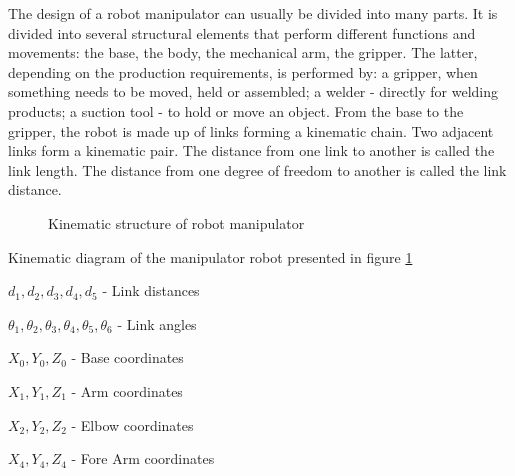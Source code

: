 The design of a robot manipulator can usually be divided into many parts.
It is divided into several structural elements that perform different functions and movements: the base, the body, the mechanical arm, the gripper. The latter, depending on the production requirements, is performed by: a gripper, when something needs to be moved, held or assembled; a welder - directly for welding products; a suction tool - to hold or move an object. From the base to the gripper, the robot is made up of links forming a kinematic chain. Two adjacent links form a kinematic pair. The distance from one link to another is called the link length. The distance from one degree of freedom to another is called the link distance. 



\begin{figure}[H]
	\centering


\caption{Kinematic structure of robot manipulator} \label{fig:kinematic1}
\end{figure}

Kinematic diagram of the manipulator robot presented in figure \ref{fig:kinematic1} 


\begin{math}d_1 , d_2, d_3,d_4,d_5 \end{math} - Link distances

\begin{math}\theta_1 , \theta_2, \theta_3,\theta_4,\theta_5,\theta_6\end{math} - Link angles

\begin{math} X_0, Y_0, Z_0 \end{math} - Base coordinates

\begin{math} X_1, Y_1, Z_1 \end{math} - Arm coordinates

\begin{math} X_2, Y_2, Z_2 \end{math} - Elbow coordinates

\begin{math} X_4, Y_4, Z_4 \end{math} - Fore Arm coordinates

